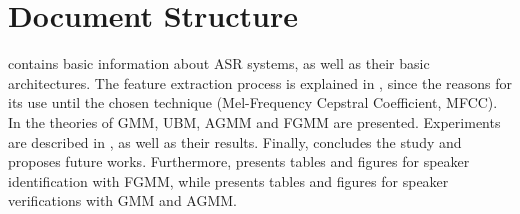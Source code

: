 \section{Document Structure}

 contains basic information about ASR systems, as well as their basic architectures. The feature extraction process is explained in , since the reasons for its use until the chosen technique (Mel-Frequency Cepstral Coefficient, MFCC). In  the theories of GMM, UBM, AGMM and FGMM are presented. Experiments are described in , as well as their results. Finally,  concludes the study and proposes future works. Furthermore,  presents tables and figures for speaker identification with FGMM, while  presents tables and figures for speaker verifications with GMM and AGMM.